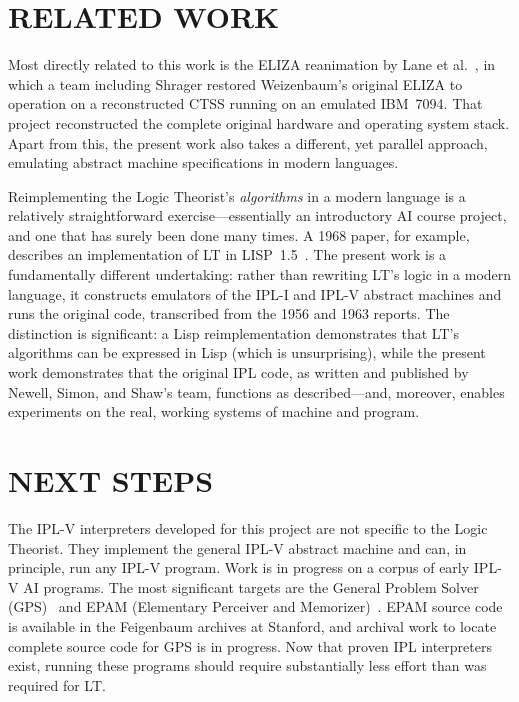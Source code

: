 \documentclass{IEEEcsmag}
\begin{document}
\section{RELATED WORK}
\label{sec:related}

Most directly related to this work
is the ELIZA reanimation by Lane
et al.~\cite{lane2025eliza}, in which a team including Shrager
restored Weizenbaum's original ELIZA to operation on a
reconstructed CTSS running on an emulated IBM~7094. That project
reconstructed the complete original hardware and operating system
stack. Apart from this, the present work also takes a different, yet parallel approach, emulating 
abstract machine specifications in modern languages.

Reimplementing the Logic Theorist's \textit{algorithms} in a modern
language is a relatively straightforward exercise---essentially an
introductory AI course project, and one that has surely been done many
times. A 1968 paper, for example, describes an implementation of LT in
LISP~1.5~\cite{millstein1968logic}. The present work is a
fundamentally different undertaking: rather than rewriting LT's logic
in a modern language, it constructs emulators of the IPL-I
and IPL-V abstract machines and runs the original code, transcribed
from the 1956 and 1963 reports. The distinction is
significant: a Lisp reimplementation demonstrates that LT's algorithms
can be expressed in Lisp (which is unsurprising), while the present
work demonstrates that the original IPL code, as written and published
by Newell, Simon, and Shaw's team, functions as described---and,
moreover, enables experiments on the real, working systems of machine
and program.

\section{NEXT STEPS}
\label{sec:next}

The IPL-V interpreters developed for this project are not specific to
the Logic Theorist. They implement the general IPL-V abstract machine
and can, in principle, run any IPL-V program. Work is in progress on
a corpus of early IPL-V AI programs. The most significant targets are
the General Problem Solver (GPS)~\cite{newell1959gps} and EPAM
(Elementary Perceiver and Memorizer)~\cite{feigenbaum1961epam}. 
EPAM source code is available in the Feigenbaum archives at Stanford, and
archival work to locate complete source code for GPS is in progress.
Now that proven IPL interpreters exist, running these programs should
require substantially less effort than was required for LT.
\end{document}
